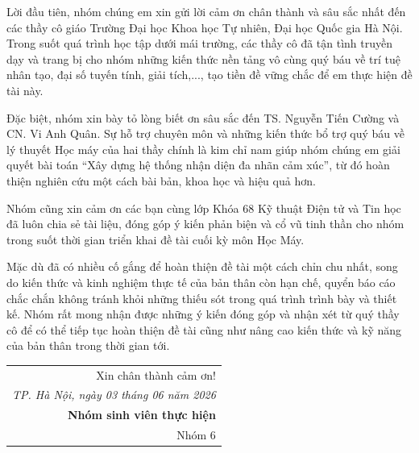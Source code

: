 
\begin{acknowledgements}
	\addchaptertocentry{\acknowledgementname}
	\thispagestyle{empty}
	
	Lời đầu tiên, nhóm chúng em xin gửi lời cảm ơn chân thành và sâu sắc nhất đến các thầy cô giáo Trường Đại học Khoa học Tự nhiên, Đại học Quốc gia Hà Nội. Trong suốt quá trình học tập dưới mái trường, các thầy cô đã tận tình truyền dạy và trang bị cho nhóm những kiến thức nền tảng vô cùng quý báu về trí tuệ nhân tạo, đại số tuyến tính, giải tích,..., tạo tiền đề vững chắc để em thực hiện đề tài này.
	
	Đặc biệt, nhóm xin bày tỏ lòng biết ơn sâu sắc đến TS. Nguyễn Tiến Cường và CN. Vi Anh Quân. Sự hỗ trợ chuyên môn và những kiến thức bổ trợ quý báu về lý thuyết Học máy của hai thầy chính là kim chỉ nam giúp nhóm chúng em giải quyết bài toán “Xây dựng hệ thống nhận diện đa nhãn cảm xúc”, từ đó hoàn thiện nghiên cứu một cách bài bản, khoa học và hiệu quả hơn.
	
	Nhóm cũng xin cảm ơn các bạn cùng lớp Khóa 68 Kỹ thuật Điện tử và Tin học đã luôn chia sẻ tài liệu, đóng góp ý kiến phản biện và cổ vũ tinh thần cho nhóm trong suốt thời gian triển khai đề tài cuối kỳ môn Học Máy.
	
	Mặc dù đã có nhiều cố gắng để hoàn thiện đề tài một cách chỉn chu nhất, song do kiến thức và kinh nghiệm thực tế của bản thân còn hạn chế, quyển báo cáo chắc chắn không tránh khỏi những thiếu sót trong quá trình trình bày và thiết kế. Nhóm rất mong nhận được những ý kiến đóng góp và nhận xét từ quý thầy cô để có thể tiếp tục hoàn thiện đề tài cũng như nâng cao kiến thức và kỹ năng của bản thân trong thời gian tới.
	
	\begin{flushright}
		\begin{tabular}{r}
			Xin chân thành cảm ơn! \\[0.6cm]
			\textit{TP. Hà Nội, ngày 03 tháng 06 năm 2026} \\[0.2cm]
			\textbf{Nhóm sinh viên thực hiện} \\[0.6cm]
			Nhóm 6
		\end{tabular}
	\end{flushright}
\end{acknowledgements}